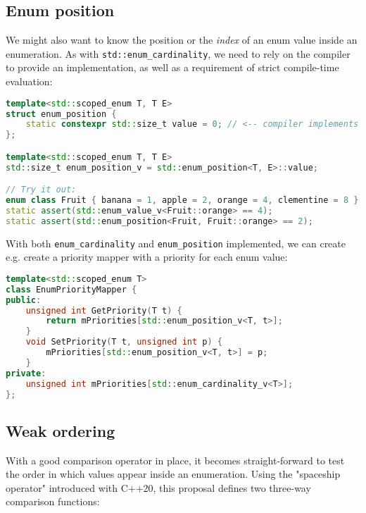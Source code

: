 \documentclass[
  format=manuscript,
  screen=true,
  review=false,
  nonacm=true,
  timestamp=true,
  balance=false]{acmart}
\begin{document}
\subsection{Enum position}

We might also want to know the position or the \textit{index} of an enum value
inside an enumeration. As with \texttt{std::enum\_cardinality}, we need to rely
on the compiler to provide an implementation, as well as a requirement of strict
compile-time evaluation:\vspace{2mm}

\begin{lstlisting}[language=Cpp]
template<std::scoped_enum T, T E>
struct enum_position {
    static constexpr std::size_t value = 0; // <-- compiler implements this
};

template<std::scoped_enum T, T E>
std::size_t enum_position_v = std::enum_position<T, E>::value;

// Try it out:
enum class Fruit { banana = 1, apple = 2, orange = 4, clementine = 8 };
static assert(std::enum_value_v<Fruit::orange> == 4);
static assert(std::enum_position<Fruit, Fruit::orange> == 2);
\end{lstlisting}

\noindent
With both \texttt{enum\_cardinality} and \texttt{enum\_position} implemented, we
can create e.g. create a priority mapper with a priority for each enum value:\vspace{2mm}

\begin{lstlisting}[language=Cpp]
template<std::scoped_enum T>
class EnumPriorityMapper {
public:
    unsigned int GetPriority(T t) {
        return mPriorities[std::enum_position_v<T, t>];
    }
    void SetPriority(T t, unsigned int p) {
        mPriorities[std::enum_position_v<T, t>] = p;
    }
private:
    unsigned int mPriorities[std::enum_cardinality_v<T>];
};
\end{lstlisting}


\subsection{Weak ordering}

With a good comparison operator in place, it becomes straight-forward to test
the order in which values appear inside an enumeration. Using the "spaceship operator"
introduced with C++20, this proposal defines two three-way comparison functions:\vspace{2mm}
\end{document}

